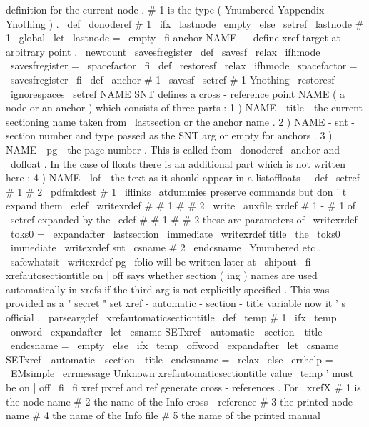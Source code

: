 {{{{definition
for
the
current
node
.
#
1
is
the
%
type
(
Ynumbered
Yappendix
Ynothing
)
.
%
\
def
\
donoderef
#
1
{
%
\
ifx
\
lastnode
\
empty
\
else
\
setref
{
\
lastnode
}
{
#
1
}
%
\
global
\
let
\
lastnode
=
\
empty
\
fi
}
%
anchor
{
NAME
}
-
-
define
xref
target
at
arbitrary
point
.
%
\
newcount
\
savesfregister
%
\
def
\
savesf
{
\
relax
\
ifhmode
\
savesfregister
=
\
spacefactor
\
fi
}
\
def
\
restoresf
{
\
relax
\
ifhmode
\
spacefactor
=
\
savesfregister
\
fi
}
\
def
\
anchor
#
1
{
\
savesf
\
setref
{
#
1
}
{
Ynothing
}
\
restoresf
\
ignorespaces
}
%
\
setref
{
NAME
}
{
SNT
}
defines
a
cross
-
reference
point
NAME
(
a
node
or
an
%
anchor
)
which
consists
of
three
parts
:
%
1
)
NAME
-
title
-
the
current
sectioning
name
taken
from
\
lastsection
%
or
the
anchor
name
.
%
2
)
NAME
-
snt
-
section
number
and
type
passed
as
the
SNT
arg
or
%
empty
for
anchors
.
%
3
)
NAME
-
pg
-
the
page
number
.
%
%
This
is
called
from
\
donoderef
\
anchor
and
\
dofloat
.
In
the
case
of
%
floats
there
is
an
additional
part
which
is
not
written
here
:
%
4
)
NAME
-
lof
-
the
text
as
it
should
appear
in
a
listoffloats
.
%
\
def
\
setref
#
1
#
2
{
%
\
pdfmkdest
{
#
1
}
%
\
iflinks
{
%
\
atdummies
%
preserve
commands
but
don
'
t
expand
them
\
edef
\
writexrdef
#
#
1
#
#
2
{
%
\
write
\
auxfile
{
xrdef
{
#
1
-
%
#
1
of
\
setref
expanded
by
the
\
edef
#
#
1
}
{
#
#
2
}
}
%
these
are
parameters
of
\
writexrdef
}
%
\
toks0
=
\
expandafter
{
\
lastsection
}
%
\
immediate
\
writexrdef
{
title
}
{
\
the
\
toks0
}
%
\
immediate
\
writexrdef
{
snt
}
{
\
csname
#
2
\
endcsname
}
%
\
Ynumbered
etc
.
\
safewhatsit
{
\
writexrdef
{
pg
}
{
\
folio
}
}
%
will
be
written
later
at
\
shipout
}
%
\
fi
}
%
xrefautosectiontitle
on
|
off
says
whether
section
(
ing
)
names
are
used
%
automatically
in
xrefs
if
the
third
arg
is
not
explicitly
specified
.
%
This
was
provided
as
a
"
secret
"
set
xref
-
automatic
-
section
-
title
%
variable
now
it
'
s
official
.
%
\
parseargdef
\
xrefautomaticsectiontitle
{
%
\
def
\
temp
{
#
1
}
%
\
ifx
\
temp
\
onword
\
expandafter
\
let
\
csname
SETxref
-
automatic
-
section
-
title
\
endcsname
=
\
empty
\
else
\
ifx
\
temp
\
offword
\
expandafter
\
let
\
csname
SETxref
-
automatic
-
section
-
title
\
endcsname
=
\
relax
\
else
\
errhelp
=
\
EMsimple
\
errmessage
{
Unknown
xrefautomaticsectiontitle
value
\
temp
'
must
be
on
|
off
}
%
\
fi
\
fi
}
%
%
xref
pxref
and
ref
generate
cross
-
references
.
For
\
xrefX
#
1
is
%
the
node
name
#
2
the
name
of
the
Info
cross
-
reference
#
3
the
printed
%
node
name
#
4
the
name
of
the
Info
file
#
5
the
name
of
the
printed
%
manual
}}}}
